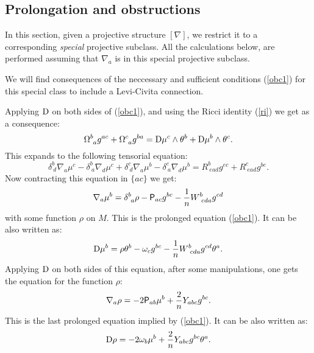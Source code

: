 \documentclass[letterpaper]{amsart}
\theoremstyle{definition}
\theoremstyle{remark}
\newcommand{\be}{\begin{equation}}
\newcommand{\ee}{\end{equation}}
\newcommand{\D}{{\rm D}}
\newcommand{\dz}{\wedge}
\newcommand{\Rho}{{\mbox{\sf P}}}
\begin{document}
\subsection{Prolongation and obstructions}
In this section, given a projective structure $[\nabla]$, we restrict
it to a corresponding \emph{special} projective subclass. All the
calculations below, are performed assuming that $\nabla_a$ is in this
special projective subclass. 


We will find consequences of the neccessary and sufficient conditions
(\ref{obc1}) for this special class to include a Levi-Civita
connection.

Applying $\D$ on both sides  of (\ref{obc1}), and using the Ricci
identity (\ref{ri}) we get as a consequence:
\be
\Omega^b_{~a}g^{ac}+\Omega^c_{~a}g^{ba}=\D\mu^c\dz\theta^b+\D\mu^b\dz\theta^c.\label{pa}\ee
This expands to the following tensorial equation:
\be
\delta^b_{~d}\nabla_a\mu^c-\delta^b_{~a}\nabla_d\mu^c+\delta^c_{~d}\nabla_a\mu^b-\delta^c_{~a}\nabla_d\mu^b=R^b_{~ead}g^{ec}+R^c_{~ead}g^{be}.\label{paw}\ee
Now contracting this equation in $\{ac\}$ we get:
\be
\nabla_a\mu^b=\delta^b_{~a}\rho-\Rho_{ac}g^{bc}-\frac{1}{n}W^b_{~cda}g^{cd}
\ee
with some function $\rho$ on $M$. This is the prolonged equation
(\ref{obc1}). It can be also written as:
\be
\D\mu^b=\rho\theta^b-\omega_cg^{bc}-\frac{1}{n}W^b_{~cda}g^{cd}\theta^a.\label{wai}
\ee
Applying $\D$ on both sides of this equation, after some
manipulations, one gets the equation for the function $\rho$:
\be
\nabla_a\rho=-2\Rho_{ab}\mu^b+\frac{2}{n}Y_{abc}g^{bc}.\ee 
This is the last prolonged equation implied by (\ref{obc1}). It can be
also written as:
\be
\D\rho=-2\omega_b\mu^b+\frac{2}{n}Y_{abc}g^{bc}\theta^a.\label{vai}\ee
\end{document}
